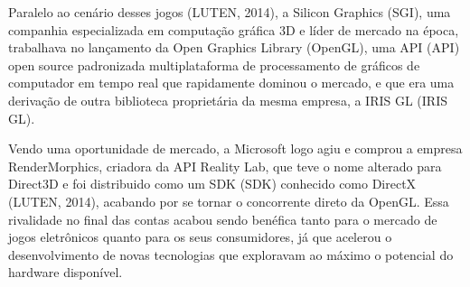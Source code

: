 Paralelo ao cenário desses jogos (LUTEN, 2014)\nocite{openGLBook}, a Silicon Graphics (\acrshort{SGI}), uma companhia especializada em computação gráfica 3D e líder de mercado na época, trabalhava no lançamento da Open Graphics Library (\acrshort{OpenGL}), uma API (\acrlong{API}) open source padronizada multiplataforma de processamento de gráficos de computador em tempo real que rapidamente dominou o mercado, e que era uma derivação de outra biblioteca proprietária da mesma empresa, a IRIS GL (\acrlong{IRIS GL}). 

Vendo uma oportunidade de mercado, a Microsoft logo agiu e comprou a empresa RenderMorphics, criadora da \acrshort{API} Reality Lab, que teve o nome alterado para Direct3D e foi distribuido como um SDK (\acrlong{SDK}) conhecido como DirectX (LUTEN, 2014)\nocite{openGLBook}, acabando por se tornar o concorrente direto da \acrshort{OpenGL}. Essa rivalidade no final das contas acabou sendo benéfica tanto para o mercado de jogos eletrônicos quanto para os seus consumidores, já que acelerou o desenvolvimento de novas tecnologias que exploravam ao máximo o potencial do hardware disponível.
	
